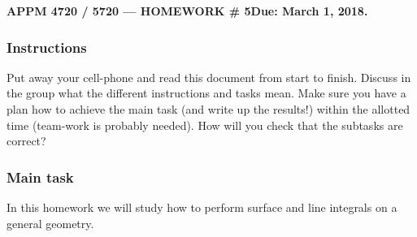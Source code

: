 \documentclass[11pt]{article}
\begin{document}
\begin{center}
\textbf{APPM 4720 / 5720 --- HOMEWORK  \# 5\hfill Due: March 1, 2018.}
\end{center}

\subsubsection*{Instructions}
Put away your cell-phone and read this document from start to finish. Discuss in the group what the different instructions and tasks mean. Make sure you have a plan how to achieve the main task (and write up the results!) within the allotted time (team-work is probably needed). How will you check that the subtasks are correct?      

\subsubsection*{Main task}
In this homework we will study how to perform surface and line integrals on a general geometry.  
\end{document}
